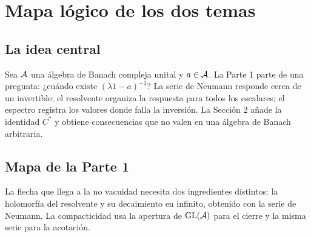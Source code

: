 \chapter{Mapa lógico de los dos temas}

\section{La idea central}

Sea $\mathcal A$ una álgebra de Banach compleja unital y $a\in\mathcal A$. La Parte 1 parte de una pregunta:
¿cuándo existe $(\lambda1-a)^{-1}$? La serie de Neumann responde cerca de un invertible; el
resolvente organiza la respuesta para todos los escalares; el espectro registra los valores donde
falla la inversión. La Sección 2 añade la identidad $C^*$ y obtiene consecuencias que no valen en
una álgebra de Banach arbitraria.

\section{Mapa de la Parte 1}

\begin{center}
\end{center}

La flecha que llega a la no vacuidad necesita dos ingredientes distintos: la holomorfía del
resolvente y su decaimiento en infinito, obtenido con la serie de Neumann. La compacticidad usa
la apertura de $\operatorname{GL}(\mathcal A)$ para el cierre y la misma serie para la acotación.

